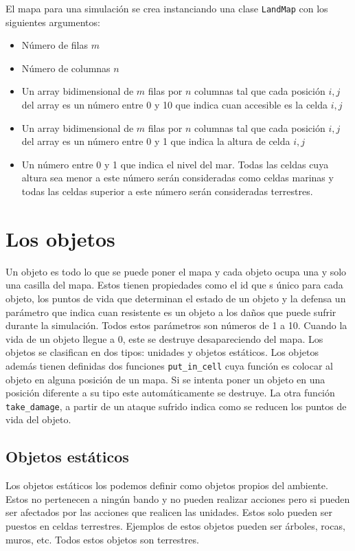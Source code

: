El mapa para una simulaci\'on se crea instanciando una clase \verb|LandMap| con los siguientes argumentos:

\begin{itemize}
	\item N\'umero de filas $m$
	\item N\'umero de columnas $n$
	\item Un array bidimensional de $m$ filas por $n$ columnas tal que cada posici\'on $i,j$ del array es un n\'umero entre 0 y 10 que indica cuan accesible es la celda $i,j$
	\item Un array bidimensional de $m$ filas por $n$ columnas tal que cada posici\'on $i,j$ del array es un n\'umero entre 0 y 1 que indica la altura de celda $i,j$
	\item Un n\'umero entre 0 y 1 que indica el nivel del mar. Todas las celdas cuya altura sea menor a este n\'umero ser\'an consideradas como celdas marinas y todas las celdas superior a este n\'umero ser\'an consideradas terrestres.
\end{itemize}

\section{Los objetos}

Un objeto es todo lo que se puede poner el mapa y cada objeto ocupa una y solo una casilla del mapa. Estos tienen propiedades como el id que s \'unico para cada objeto, los puntos de vida que determinan el estado de un objeto y la defensa un par\'ametro que indica cuan resistente es un objeto a los da\~{n}os que puede sufrir durante la simulaci\'on. Todos estos par\'ametros son n\'umeros de 1 a 10. Cuando la vida de un objeto llegue a 0, este se destruye desapareciendo del mapa. Los objetos se clasifican en dos tipos: unidades y objetos est\'aticos. Los objetos adem\'as tienen definidas dos funciones \verb|put_in_cell| cuya funci\'on es colocar al objeto en alguna posici\'on de un mapa. Si se intenta poner un objeto en una posici\'on diferente a su tipo este autom\'aticamente se destruye. La otra funci\'on \verb|take_damage|, a partir de un ataque sufrido indica como se reducen los puntos de vida del objeto.

\subsection{Objetos est\'aticos}

Los objetos est\'aticos los podemos definir como objetos propios del ambiente. Estos no pertenecen a ning\'un bando y no pueden realizar acciones pero si pueden ser afectados por las acciones que realicen las unidades. Estos solo pueden ser puestos en celdas terrestres. Ejemplos de estos objetos pueden ser \'arboles, rocas, muros, etc. Todos estos objetos son terrestres. 

